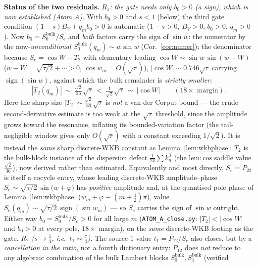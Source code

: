 \begin{remark}
\textbf{Status of the two residuals.}
\emph{$R_1$: the gate needs only $b_0>0$ \textup(a sign\textup), which is now established
\textup{(Atom A)}.} With $b_0>0$ and $s<1$ \textup(below\textup) the third gate condition
$(1-s)B_V+q_mb_0>0$ is automatic ($1-s>0$, $B_V>0$, $b_0>0$, $q_m>0$). Now $b_0=S_0^{\mathrm{bulk}}/S_e$ and
\emph{both} factors carry the sign of $\sin w$: the numerator by the now-\emph{unconditional}
$S_0^{\mathrm{bulk}}(q_m)\sim w\sin w$ \textup(Cor.~\ref{cor:numer}\textup); the denominator because
$S_e=\cos W-T_2$ with elementary leading $\cos W\sim\sin w\,\sin(w-W)$ \textup($w-W=\sqrt{\tau/2}+\cdots>0$,
$\cos w_m=O(\sqrt\tau)$\textup), $|\cos W|\sim0.746\sqrt\tau$ carrying $\operatorname{sign}(\sin w)$, against
which the bulk remainder is \emph{strictly smaller}:
\begin{equation}\label{eq:atomA}
   |T_2(q_m)|\ \sim\ \tfrac{\sqrt2}{36}\sqrt\tau\ <\ \tfrac1{\sqrt2}\sqrt\tau\ \sim\ |\cos W|
   \qquad(18\times\text{ margin}).
\end{equation}
Here the sharp size $|T_2|\sim\tfrac{\sqrt2}{36}\sqrt\tau$ is \emph{not} a van der Corput bound --- the crude
second-derivative estimate is too weak at the $\sqrt\tau$ threshold, since the amplitude grows toward the
resonance, inflating its bounded-variation factor (the tail-negligible window gives only $O(\sqrt\tau)$ with a
constant exceeding $1/\sqrt2$). It is instead the \emph{same} sharp discrete-WKB constant as
Lemma~\ref{lem:wkbphase}: $T_2$ is the bulk-block instance of the dispersion defect $\tfrac1{24}\sum k_n^3$ (the
$\mathrm{lem:cos}$ saddle value $\tfrac{\sqrt2}{36}$), now derived rather than estimated. Equivalently and most
directly, $S_e=P_{22}$ is itself a cocycle entry, whose leading discrete-WKB amplitude--phase
$S_e\sim\sqrt{\tau/2}\,\sin\!\bigl(w+\varphi\bigr)$ has \emph{positive} amplitude and, at the quantised pole phase
of Lemma~\ref{lem:wkbphase} ($w_m+\varphi\equiv(m+\tfrac12)\pi$), value
$S_e(q_m)\sim\sqrt{\tau/2}\,\operatorname{sign}(\sin w_m)$ --- so $S_e$ carries the sign of $\sin w$ outright.
Either way $b_0=S_0^{\mathrm{bulk}}/S_e>0$ for all large $m$ \textup(\texttt{ATOM\_A\_close.py}: $|T_2|<|\cos W|$
and $b_0>0$ at every pole, $18\times$ margin\textup), on the \emph{same} discrete-WKB footing as the gate.
\emph{$R_2$ ($s\to\tfrac14$, i.e.\ $t_1\sim\tfrac\tau4$).} The source-$1$ value $t_1=P_{12}/S_e$ also closes,
but by a \emph{cancellation in the ratio}, not a fourth dictionary entry: $P_{12}$ does \emph{not} reduce to any
algebraic combination of the bulk Lambert blocks $S_0^{\mathrm{bulk}},S_1^{\mathrm{bulk}}$ (verified

\end{remark}
